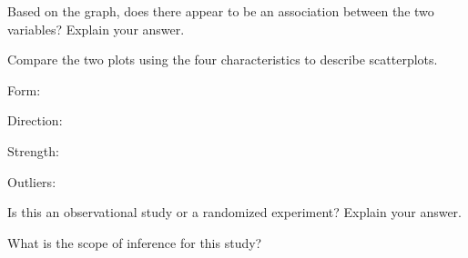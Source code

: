 \documentclass[
]{report}
\newcommand{\rgi}{\hspace{24pt}}  %
\begin{document}
\vspace{2in}

\rgi Based on the graph, does there appear to be an association between the two variables? Explain your answer.

\vspace{0.5in}

\rgi Compare the two plots using the four characteristics to describe scatterplots.

\rgi \rgi Form:

\vspace{0.2in}

\rgi \rgi Direction:

\vspace{0.2in}

\rgi \rgi Strength:

\vspace{0.2in}

\rgi \rgi Outliers:

\vspace{0.2in}

\rgi Is this an observational study or a randomized experiment? Explain your answer.

\vspace{0.5in}

\rgi What is the scope of inference for this study?

\newpage
\end{document}
